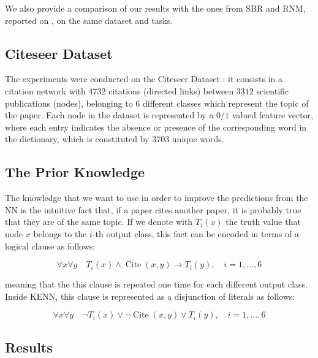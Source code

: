 We also provide a comparison of our results with the ones from SBR and RNM, reported on \cite{marra2020relational}, on the same dataset and tasks. 

\subsection{Citeseer Dataset}

The experiments were conducted on the Citeseer Dataset \cite{lu2003link}: it consists in a citation network with $4732$ citations (directed links) between $3312$ scientific publications (nodes), belonging to $6$ different classes which represent the topic of the paper. Each node in the dataset is represented by a $0/1$ valued feature vector, where each entry indicates the absence or presence of the corresponding word in the dictionary, which is constituted by $3703$ unique words.

\subsection{The Prior Knowledge}

The knowledge that we want to use in order to improve the predictions from the NN is the intuitive fact that, if a paper cites another paper, it is probably true that they are of the same topic. If we denote with $T_i(x)$ the truth value that node $x$ belongs to the $i$-th output class, this fact can be encoded in terms of a logical clause as follows:

$$\forall x \forall y \quad T_i(x) \wedge \operatorname{Cite}(x, y) \rightarrow T_i(y), \quad i=1,\dots,6$$

meaning that the this clause is repeated one time for each different output class. Inside KENN, this clause is represented as a disjunction of literals as follows:

$$\forall x \forall y \quad \neg T_i(x) \vee \neg \operatorname{Cite}(x,y) \vee T_i(y), \quad i=1,\dots,6 $$


\subsection{Results}

